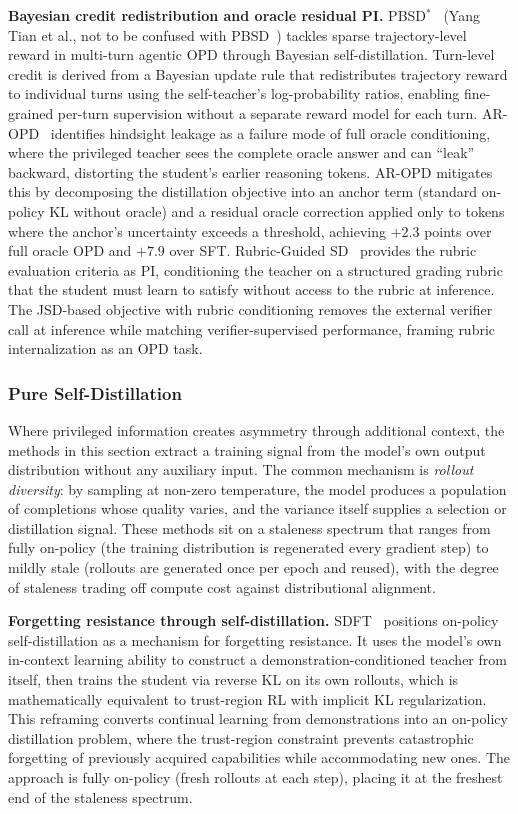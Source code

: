 \documentclass{article} %
\begin{document}
\textbf{Bayesian credit redistribution and oracle residual PI.} PBSD$^*$~\citep{2606.09348} (Yang Tian et al., not to be confused with PBSD~\citep{2605.05040}) tackles sparse trajectory-level reward in multi-turn agentic OPD through Bayesian self-distillation. Turn-level credit is derived from a Bayesian update rule that redistributes trajectory reward to individual turns using the self-teacher's log-probability ratios, enabling fine-grained per-turn supervision without a separate reward model for each turn. AR-OPD~\citep{2606.10385} identifies hindsight leakage as a failure mode of full oracle conditioning, where the privileged teacher sees the complete oracle answer and can ``leak'' backward, distorting the student's earlier reasoning tokens. AR-OPD mitigates this by decomposing the distillation objective into an anchor term (standard on-policy KL without oracle) and a residual oracle correction applied only to tokens where the anchor's uncertainty exceeds a threshold, achieving $+2.3$ points over full oracle OPD and $+7.9$ over SFT. Rubric-Guided SD~\citep{2606.12507} provides the rubric evaluation criteria as PI, conditioning the teacher on a structured grading rubric that the student must learn to satisfy without access to the rubric at inference. The JSD-based objective with rubric conditioning removes the external verifier call at inference while matching verifier-supervised performance, framing rubric internalization as an OPD task.

\subsubsection{Pure Self-Distillation}
\label{subsec:self_play}

Where privileged information creates asymmetry through additional context, the methods in this section extract a training signal from the model's own output distribution without any auxiliary input. The common mechanism is \emph{rollout diversity}: by sampling at non-zero temperature, the model produces a population of completions whose quality varies, and the variance itself supplies a selection or distillation signal. These methods sit on a staleness spectrum that ranges from fully on-policy (the training distribution is regenerated every gradient step) to mildly stale (rollouts are generated once per epoch and reused), with the degree of staleness trading off compute cost against distributional alignment.

\textbf{Forgetting resistance through self-distillation.} SDFT~\citep{2601.19897} positions on-policy self-distillation as a mechanism for forgetting resistance. It uses the model's own in-context learning ability to construct a demonstration-conditioned teacher from itself, then trains the student via reverse KL on its own rollouts, which is mathematically equivalent to trust-region RL with implicit KL regularization. This reframing converts continual learning from demonstrations into an on-policy distillation problem, where the trust-region constraint prevents catastrophic forgetting of previously acquired capabilities while accommodating new ones. The approach is fully on-policy (fresh rollouts at each step), placing it at the freshest end of the staleness spectrum.
\end{document}
